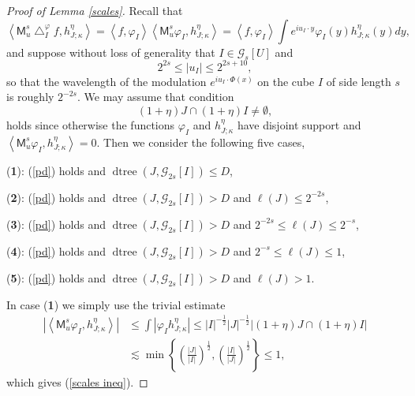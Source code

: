 \documentclass{amsart}%
\theoremstyle{plain}
\numberwithin{equation}{section}
\begin{document}
\begin{proof}
[Proof of Lemma \ref{scales}]Recall that%
\[
\left\langle \mathsf{M}_{u}^{s}\bigtriangleup_{I}^{\varphi}f,h_{J;\kappa
}^{\eta}\right\rangle =\left\langle f,\varphi_{I}\right\rangle \left\langle
\mathsf{M}_{u}^{s}\varphi_{I},h_{J;\kappa}^{\eta}\right\rangle =\left\langle
f,\varphi_{I}\right\rangle \int e^{iu_{I}\cdot y}\varphi_{I}\left(  y\right)
h_{J;\kappa}^{\eta}\left(  y\right)  dy,
\]
and suppose without loss of generality that $I\in\mathcal{G}_{s}\left[
U\right]  $ and%
\[
2^{2s}\leq\left\vert u_{I}\right\vert \leq2^{2s+10},
\]
so that the wavelength of the modulation $e^{iu_{I}\cdot\Phi\left(  x\right)
}$ on the cube $I$ of side length $s$ is roughly $2^{-2s}$. We may assume that
condition
\begin{equation}
\left(  1+\eta\right)  J\cap\left(  1+\eta\right)  I\neq\emptyset,\label{pd}%
\end{equation}
holds since otherwise the functions $\varphi_{I}$ and $h_{J;\kappa}^{\eta} $
have disjoint support and $\left\langle \mathsf{M}_{u}^{s}\varphi
_{I},h_{J;\kappa}^{\eta}\right\rangle =0$. Then we consider the following five cases,

(\textbf{1}): (\ref{pd}) holds and $\operatorname*{dtree}\left(
J,\mathcal{G}_{2s}\left[  I\right]  \right)  \leq D$,

(\textbf{2}): (\ref{pd}) holds and $\operatorname*{dtree}\left(
J,\mathcal{G}_{2s}\left[  I\right]  \right)  >D$ and $\ell\left(  J\right)
\leq2^{-2s}$,

(\textbf{3}): (\ref{pd}) holds and $\operatorname*{dtree}\left(
J,\mathcal{G}_{2s}\left[  I\right]  \right)  >D$ and $2^{-2s}\leq\ell\left(
J\right)  \leq2^{-s} $,

(\textbf{4}): (\ref{pd}) holds and $\operatorname*{dtree}\left(
J,\mathcal{G}_{2s}\left[  I\right]  \right)  >D$ and $2^{-s}\leq\ell\left(
J\right)  \leq1$,

(\textbf{5}): (\ref{pd}) holds and $\operatorname*{dtree}\left(
J,\mathcal{G}_{2s}\left[  I\right]  \right)  >D$ and $\ell\left(  J\right)
>1$.

In case (\textbf{1}) we simply use the trivial estimate%
\begin{align*}
\left\vert \left\langle \mathsf{M}_{u}^{s}\varphi_{I},h_{J;\kappa}^{\eta
}\right\rangle \right\vert  & \leq\int\left\vert \varphi_{I}h_{J;\kappa}%
^{\eta}\right\vert \leq\left\vert I\right\vert ^{-\frac{1}{2}}\left\vert
J\right\vert ^{-\frac{1}{2}}\left\vert \left(  1+\eta\right)  J\cap\left(
1+\eta\right)  I\right\vert \\
& \lesssim\min\left\{  \left(  \frac{\left\vert J\right\vert }{\left\vert
I\right\vert }\right)  ^{\frac{1}{2}},\left(  \frac{\left\vert I\right\vert
}{\left\vert J\right\vert }\right)  ^{\frac{1}{2}}\right\}  \leq1,
\end{align*}
which gives (\ref{scales ineq}).


\end{proof}
\end{document}
